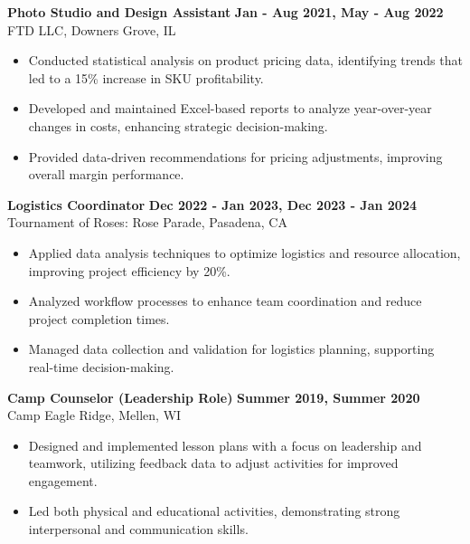 \documentclass[10pt]{article}
\begin{document}
\textbf{Photo Studio and Design Assistant} \hfill \textbf{Jan - Aug 2021, May - Aug 2022} \\
FTD LLC, Downers Grove, IL \\
\begin{itemize}[noitemsep,nosep]
    \item Conducted statistical analysis on product pricing data, identifying trends that led to a 15\% increase in SKU profitability.
    \item Developed and maintained Excel-based reports to analyze year-over-year changes in costs, enhancing strategic decision-making.
    \item Provided data-driven recommendations for pricing adjustments, improving overall margin performance.
\end{itemize}

\vspace{0pt}
\textbf{Logistics Coordinator} \hfill \textbf{Dec 2022 - Jan 2023, Dec 2023 - Jan 2024} \\
Tournament of Roses: Rose Parade, Pasadena, CA \\
\begin{itemize}[noitemsep,nosep]
    \item Applied data analysis techniques to optimize logistics and resource allocation, improving project efficiency by 20\%.
    \item Analyzed workflow processes to enhance team coordination and reduce project completion times.
    \item Managed data collection and validation for logistics planning, supporting real-time decision-making.
\end{itemize}

\vspace{0pt}
\textbf{Camp Counselor (Leadership Role)} \hfill \textbf{Summer 2019, Summer 2020} \\
Camp Eagle Ridge, Mellen, WI \\
\begin{itemize}[noitemsep,nosep]
    \item Designed and implemented lesson plans with a focus on leadership and teamwork, utilizing feedback data to adjust activities for improved engagement.
    \item Led both physical and educational activities, demonstrating strong interpersonal and communication skills.
\end{itemize}

\vspace{-10pt}
\end{document}
